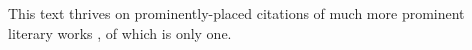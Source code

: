 \documentclass[a5paper, pdftex, 12pt]{scrartcl}
\begin{document}
\thispagestyle{empty}

This text thrives on prominently-placed citations \cite[e.\,g.,][]{Frank1957} of much more prominent literary works \cite[cf.][p. 7]{Orwell1957}, of which \cite{Hawking1988} is only one.


\end{document}
